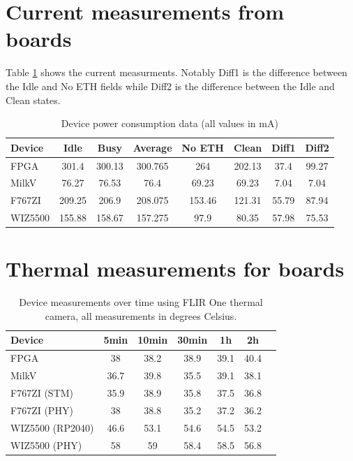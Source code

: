 \section{Current measurements from boards}
\label{app:current_measurements}

Table \ref{tab:power_consumption} shows the current measurments. Notably Diff1 is the difference between the Idle and No ETH fields while Diff2 is the difference between the Idle and Clean states.

\begin{table}[ht]
    \centering
    \caption{Device power consumption data (all values in mA)}
    \label{tab:power_consumption}
    \begin{tabular}{lccccccc}
    \toprule
    Device    & Idle  & Busy  & Average  & No ETH  & Clean  & Diff1  & Diff2 \\
    \midrule
    FPGA      & 301.4     & 300.13    & 300.765      & 264         & 202.13           & 37.4     & 99.27       \\
    MilkV     & 76.27     & 76.53     & 76.4         & 69.23       & 69.23            & 7.04     & 7.04       \\
    F767ZI    & 209.25    & 206.9     & 208.075      & 153.46      & 121.31           & 55.79    & 87.94       \\
    WIZ5500   & 155.88    & 158.67    & 157.275      & 97.9        & 80.35            & 57.98    & 75.53       \\
    \bottomrule
    \end{tabular}
\end{table}


\section{Thermal measurements for boards}
\label{app:thermal_measurements}
\begin{table}[ht]
    \centering
    \caption{Device measurements over time using FLIR One thermal camera, all measurements in degrees Celsius.}
    \label{tab:measurements}
    \begin{tabular}{lcccccc}
    \toprule
    Device & 5min & 10min & 30min & 1h & 2h \\
    \midrule
    FPGA & 38 & 38.2 & 38.9 & 39.1 & 40.4 \\
    MilkV & 36.7 & 39.8 & 35.5 & 39.1 & 38.1 \\
    F767ZI (STM) & 35.9 & 38.9 & 35.8 & 37.5 & 36.8 \\
    F767ZI (PHY) & 38 & 38.8 & 35.2 & 37.2 & 36.2 \\
    WIZ5500 (RP2040) & 46.6 & 53.1 & 54.6 & 54.5 & 53.2 \\
    WIZ5500 (PHY) & 58 & 59 & 58.4 & 58.5 & 56.8 \\
    \bottomrule
\end{tabular}
\end{table}


